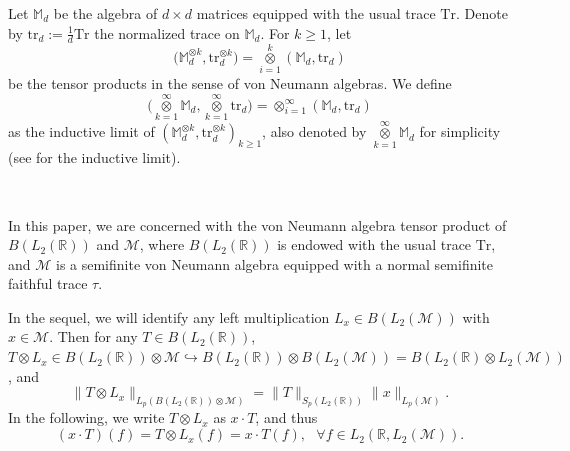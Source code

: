 \documentclass[oneside,english,a4wide]{amsart}
\numberwithin{equation}{section}
\numberwithin{figure}{section}
\theoremstyle{plain}
\theoremstyle{plain}
\theoremstyle{definition}
\theoremstyle{plain}
\theoremstyle{remark}
\theoremstyle{definition}
\theoremstyle{remark}
\theoremstyle{definition}
\newcommand{\M}{{\mathcal M}}
\newcommand{\8}{\infty}
\begin{document}
Let $\mathbb{M}_d$ be the algebra of $d\times d$ matrices equipped with the usual trace $\mathrm{Tr}$. Denote by $\mathrm{tr}_d:=\frac{1}{d}\mathrm{Tr}$ the normalized trace on $\mathbb{M}_d$. For $k\geq 1$, let
\begin{equation*}
	\big(\mathbb{M}_d^{\otimes k},\text{tr}_d^{\otimes k}\big)=\mathop{\otimes}\limits_{i=1}^k(\mathbb{M}_d,\mathrm{tr}_d)
\end{equation*}
be the tensor products in the sense of von Neumann algebras. We define 	$$\Big(\mathop{\otimes}\limits_{k=1}^{\infty}\mathbb{M}_{d},\mathop{\otimes}\limits_{k=1}^{\infty}\mathrm{tr}_{d}\Big)= \mathop{\otimes}_{i=1}^{\infty}(\mathbb{M}_d,\mathrm{tr}_d)$$
as the inductive limit of $(\mathbb{M}_d^{\otimes k}, \text{tr}_d^{\otimes k})_{k\geq 1}$, also denoted by $\mathop{\otimes}\limits_{k=1}^{\infty}\mathbb{M}_{d}$ for simplicity (see \cite[Lemma 4.5]{HM1} for the inductive limit).

\

In this paper, we are concerned with the von Neumann algebra tensor product of $B(L_2(\mathbb{R}))$ and $\M$, where $B(L_2(\mathbb{R}))$ is endowed with the usual trace $\text{Tr}$, and $\M$ is a semifinite von Neumann algebra equipped with a normal semifinite faithful trace $\tau$.

In the sequel, we will identify any left multiplication $L_x\in B(L_2(\M))$ with $x\in \M$. Then for any $T\in B(L_2(\mathbb{R}))$, $T\otimes L_x \in B(L_2(\mathbb{R}))\otimes \M\hookrightarrow B(L_2(\mathbb{R}))\otimes B(L_2(\M))=B(L_2(\mathbb{R})\otimes L_2(\M))$, and 
$$ \| T\otimes L_x\|_{L_p(B(L_2(\mathbb{R}))\otimes \mathcal{M})}=\|T\|_{S_p(L_2(\mathbb{R}))}\|x\|_{L_p(\mathcal{M})}.$$
In the following, we write $T\otimes L_x$ as $x\cdot T$, and thus
\begin{equation}\label{XT}
	(x\cdot T)(f)=T\otimes L_x(f)=x\cdot T(f),\,\,\,\,\forall f\in L_2(\mathbb{R},L_2(\mathcal{M})).
\end{equation}

\end{document}
